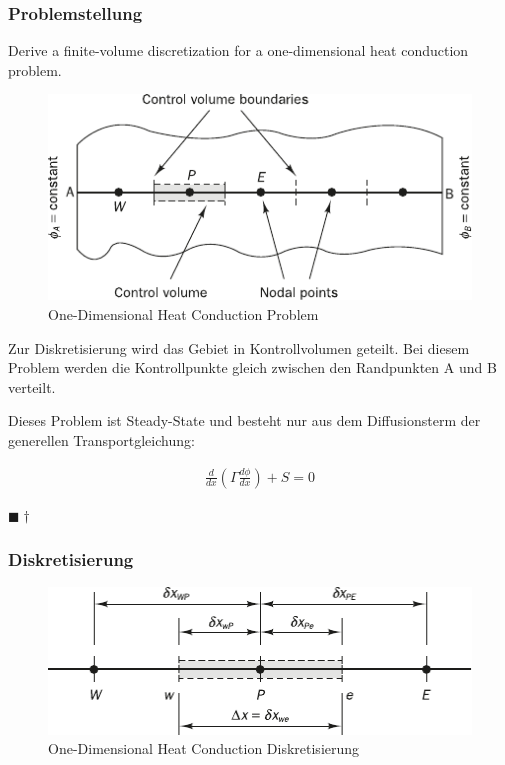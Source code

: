\documentclass[a4paper]{scrartcl}
\newcommand{\qed}{\begin{flushright}
$\blacksquare \dagger$ \end{flushright}}
\begin{document}
\subsubsection{Problemstellung}
Derive a finite-volume discretization for a one-dimensional heat conduction
problem. 

\begin{figure}[h]
\begin{center}
\includegraphics[scale=1]{images/41.pdf}
\caption{One-Dimensional Heat Conduction Problem}
\label{fig:41}
\end{center}
\end{figure}
Zur Diskretisierung wird das Gebiet in Kontrollvolumen geteilt. Bei diesem
Problem werden die Kontrollpunkte gleich zwischen den Randpunkten A und B
verteilt.

 Dieses Problem ist Steady-State und besteht nur aus dem Diffusionsterm der
 generellen Transportgleichung:
 
 \begin{align}
 \frac{d}{dx} \left( \Gamma \frac{d\phi}{dx}\right) + S = 0
 \end{align}
 \qed

\subsubsection{Diskretisierung}


\begin{figure}[h]
\begin{center}
\includegraphics[scale=1.2]{images/42.pdf}
\caption{One-Dimensional Heat Conduction Diskretisierung}
\label{fig:42}
\end{center}
\end{figure}
\end{document}
